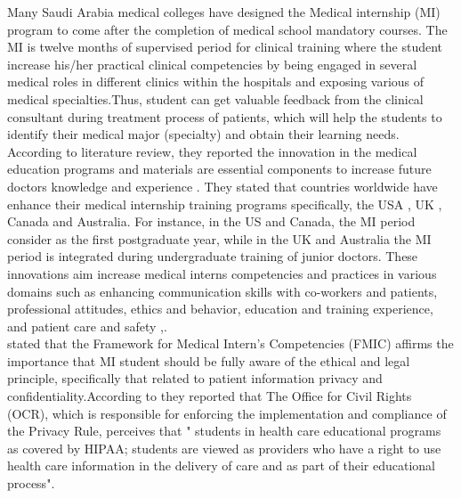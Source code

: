 Many Saudi Arabia medical colleges have designed the Medical internship (MI) program to come after the completion of medical school mandatory courses. The MI is twelve months of supervised period for clinical training where the student increase his/her practical clinical competencies by being engaged in several medical roles in different clinics within the hospitals and exposing various of medical specialties.Thus, student can get valuable feedback from the clinical consultant during treatment process of patients, which will help the students to identify their medical major (specialty) and obtain their learning needs. According to \citet{Al-Moamary2010} literature review, they reported the innovation in the medical education programs and materials are essential components to increase future doctors knowledge and experience . They stated that countries worldwide have enhance their medical internship training programs specifically, the USA , UK , Canada and Australia. For instance, in the US and Canada, the MI period consider as the first postgraduate year, while in the UK and Australia the MI period is integrated during undergraduate training of junior doctors. These innovations aim increase medical interns competencies and practices in various domains such as enhancing communication skills with co-workers and patients, professional attitudes, ethics and behavior, education and training experience, and patient care and safety \cite{Al-Moamary2010},\cite{FaculityofMedicine2009}.
\\
\citet{Al-moamary2012} stated that the Framework for Medical Intern's Competencies (FMIC) affirms the importance that MI student should be fully aware of the ethical and legal principle, specifically that related to patient information privacy and confidentiality.According to \citet{Wimberley2005} they reported that The Office for Civil Rights (OCR), which is responsible for enforcing the implementation and compliance of the Privacy Rule, perceives that " students in health care educational programs as covered by HIPAA; students are viewed as providers who have a right to use health care information in the delivery of care and as part of their educational process"\cite{Wimberley2005}. \\
